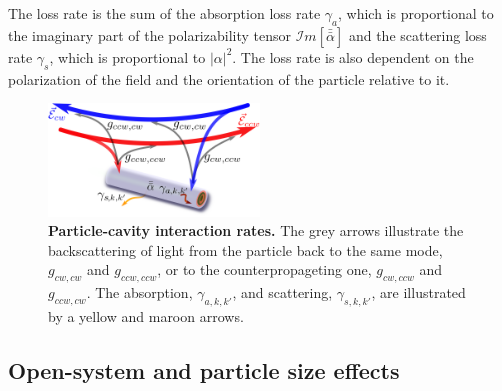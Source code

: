 \documentclass[journal=jacsat,manuscript=article]{achemso}
\begin{document}
The loss rate is the sum of the absorption loss rate $\gamma_a$, which is proportional to the imaginary part of the polarizability tensor $\mathcal{I}m[\bar{ \bar \alpha}]$ and the scattering loss rate $\gamma_s$, which is proportional to $|\alpha|^2$. The loss rate is also dependent on the polarization of the field and the orientation of the particle relative to it.
\begin{figure}[H]
\centering
             \includegraphics[trim=0cm 0.0cm 0.0cm 0.0cm, clip, width=0.5\textwidth]{Images/interaction.png}
             \caption{\textbf{Particle-cavity interaction rates.} The grey arrows illustrate the backscattering of light from the particle back to the same mode, $g_{cw,cw}$ and $g_{ccw,ccw}$, or to the counterpropageting one, $g_{cw,ccw}$ and $g_{ccw,cw}$. The absorption, $\gamma_{a,k,k'}$, and scattering, $\gamma_{s,k,k'}$, are illustrated by a yellow and maroon arrows.}
              \label{fig:cavity_tube_int}
  \end{figure}\vspace{-1cm}

\subsection{Open-system and particle size effects}
\end{document}
